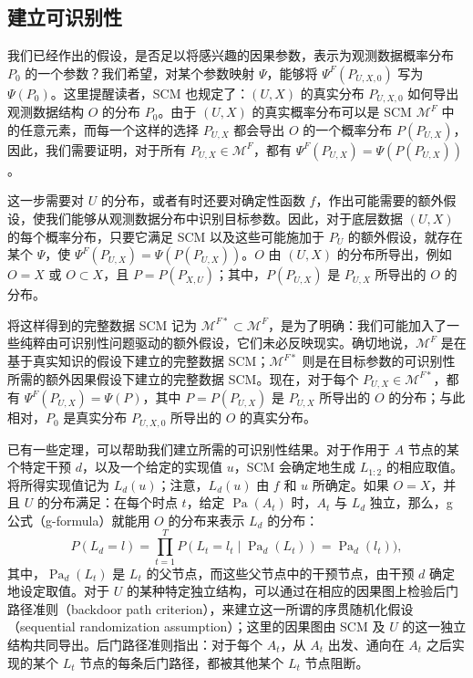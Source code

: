 \subsection{建立可识别性}
\label{subsec:ch02-identifiability}

我们已经作出的假设，是否足以将感兴趣的因果参数，表示为观测数据概率分布 $P_0$ 的一个参数？我们希望，对某个参数映射 $\Psi$，能够将 $\Psi^F(P_{U,X,0})$ 写为 $\Psi(P_0)$。这里提醒读者，SCM 也规定了：$(U,X)$ 的真实分布 $P_{U,X,0}$ 如何导出观测数据结构 $O$ 的分布 $P_0$。由于 $(U,X)$ 的真实概率分布可以是 SCM $\mathcal M^F$ 中的任意元素，而每一个这样的选择 $P_{U,X}$ 都会导出 $O$ 的一个概率分布 $P(P_{U,X})$，因此，我们需要证明，对于所有 $P_{U,X}\in\mathcal M^F$，都有 $\Psi^F(P_{U,X})=\Psi(P(P_{U,X}))$。

这一步需要对 $U$ 的分布，或者有时还要对确定性函数 $f$，作出可能需要的额外假设，使我们能够从观测数据分布中识别目标参数。因此，对于底层数据 $(U,X)$ 的每个概率分布，只要它满足 SCM 以及这些可能施加于 $P_U$ 的额外假设，就存在某个 $\Psi$，使 $\Psi^F(P_{U,X})=\Psi(P(P_{U,X}))$。$O$ 由 $(U,X)$ 的分布所导出，例如 $O=X$ 或 $O\subset X$，且 $P=P(P_{X,U})$；其中，$P(P_{U,X})$ 是 $P_{U,X}$ 所导出的 $O$ 的分布。

将这样得到的完整数据 SCM 记为 $\mathcal M^{F*}\subset\mathcal M^F$，是为了明确：我们可能加入了一些纯粹由可识别性问题驱动的额外假设，它们未必反映现实。确切地说，$\mathcal M^F$ 是在基于真实知识的假设下建立的完整数据 SCM；$\mathcal M^{F*}$ 则是在目标参数的可识别性所需的额外因果假设下建立的完整数据 SCM。现在，对于每个 $P_{U,X}\in\mathcal M^{F*}$，都有 $\Psi^F(P_{U,X})=\Psi(P)$，其中 $P=P(P_{U,X})$ 是 $P_{U,X}$ 所导出的 $O$ 的分布；与此相对，$P_0$ 是真实分布 $P_{U,X,0}$ 所导出的 $O$ 的真实分布。

已有一些定理，可以帮助我们建立所需的可识别性结果。对于作用于 $A$ 节点的某个特定干预 $d$，以及一个给定的实现值 $u$，SCM 会确定地生成 $L_{1:2}$ 的相应取值。将所得实现值记为 $L_d(u)$；注意，$L_d(u)$ 由 $f$ 和 $u$ 所确定。如果 $O=X$，并且 $U$ 的分布满足：在每个时点 $t$，给定 $\operatorname{Pa}(A_t)$ 时，$A_t$ 与 $L_d$ 独立，那么，g 公式（g-formula）就能用 $O$ 的分布来表示 $L_d$ 的分布：
\[
 P(L_d=l)=\prod_{t=1}^{T}
 P(L_t=l_t\mid\operatorname{Pa}_d(L_t))=\operatorname{Pa}_d(l_t)),
\]
其中，$\operatorname{Pa}_d(L_t)$ 是 $L_t$ 的父节点，而这些父节点中的干预节点，由干预 $d$ 确定地设定取值。对于 $U$ 的某种特定独立结构，可以通过在相应的因果图上检验后门路径准则（backdoor path criterion），来建立这一所谓的序贯随机化假设（sequential randomization assumption）；这里的因果图由 SCM 及 $U$ 的这一独立结构共同导出。后门路径准则指出：对于每个 $A_t$，从 $A_t$ 出发、通向在 $A_t$ 之后实现的某个 $L_t$ 节点的每条后门路径，都被其他某个 $L_t$ 节点阻断。


